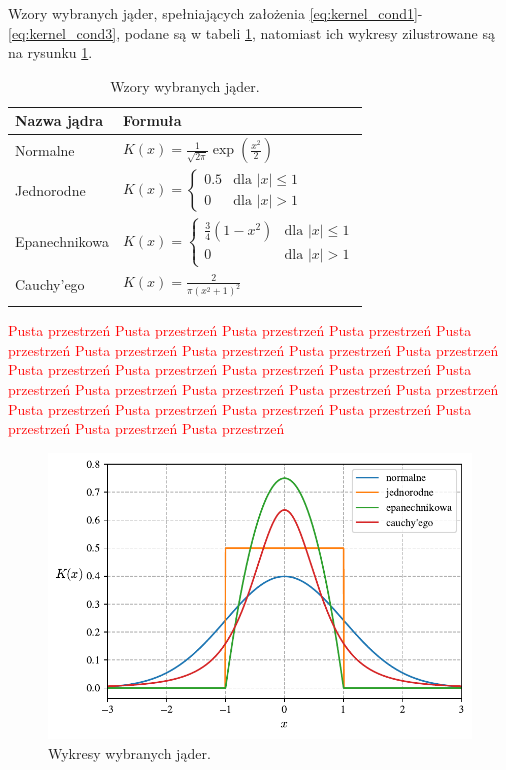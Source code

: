 \documentclass[12pt,a4paper,oneside]{book}
\theoremstyle{definition}
\begin{document}
Wzory wybranych jąder, spełniających założenia \eqref{eq:kernel_cond1}-\eqref{eq:kernel_cond3}, podane są w tabeli \ref{table:1}, natomiast ich wykresy zilustrowane są na rysunku \ref{fig:kernels}.
\begin{table}[H]
\caption{Wzory wybranych jąder.}
\centering
\begin{tabular}{ ll }
\toprule
\textbf{Nazwa jądra} & \textbf{Formuła} \\ 
\toprule
\addlinespace[0.2cm]
Normalne & $K(x) = \frac{1}{\sqrt{2 \pi}} \exp \left( \frac{x^2}{2} \right)$ \\
\addlinespace[0.2cm]
Jednorodne & $K(x) = \begin{cases} 0.5 & \text{dla } |x| \leq 1 \\ 0 & \text{dla } |x| > 1  \end{cases}$ \\ 
\addlinespace[0.2cm]
Epanechnikowa & $K(x) = \begin{cases} \frac{3}{4} (1 - x^2) & \text{dla } |x| \leq 1 \\ 0 & \text{dla } |x| > 1  \end{cases}$ \\ 
\addlinespace[0.2cm]
Cauchy'ego & $K(x) = \frac{2}{\pi (x^2 + 1)^2}$ \\
\addlinespace[0.1cm]
\bottomrule
\end{tabular}
\label{table:1}
\end{table}
\textcolor{red}{Pusta przestrzeń Pusta przestrzeń Pusta przestrzeń Pusta przestrzeń Pusta przestrzeń Pusta przestrzeń Pusta przestrzeń Pusta przestrzeń Pusta przestrzeń Pusta przestrzeń Pusta przestrzeń Pusta przestrzeń Pusta przestrzeń Pusta przestrzeń Pusta przestrzeń Pusta przestrzeń Pusta przestrzeń Pusta przestrzeń Pusta przestrzeń Pusta przestrzeń Pusta przestrzeń Pusta przestrzeń Pusta przestrzeń Pusta przestrzeń Pusta przestrzeń}

\begin{figure}[H]
\centering
\includegraphics[scale=0.7]{kernels}
\caption{Wykresy wybranych jąder.}
\label{fig:kernels}
\end{figure}
\end{document}
